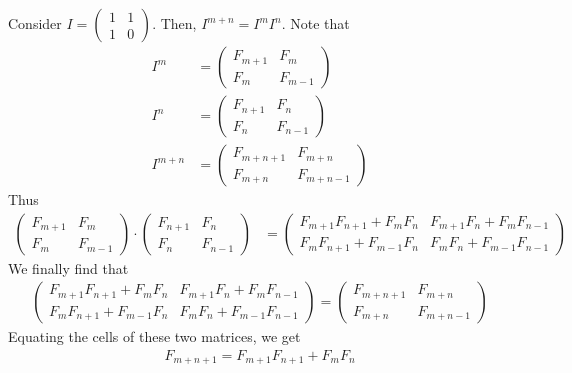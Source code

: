 \begin{solution}
Consider $I=\begin{pmatrix}
1 & 1\\
1 & 0
\end{pmatrix}$. Then, $I^{m+n}=I^mI^n$. Note that
	\begin{align*}
	I^m
		& =
		\begin{pmatrix}
			F_{m+1} & F_m\\
			F_m & F_{m-1}
		\end{pmatrix}\\
	I^n
		& =
		\begin{pmatrix}
			F_{n+1} & F_n\\
			F_n & F_{n-1}
		\end{pmatrix}\\
	 I^{m+n}
	 	& =
		\begin{pmatrix}
			F_{m+n+1} & F_{m+n}\\
			F_{m+n} & F_{m+n-1}
		\end{pmatrix}
	\end{align*}
Thus
\begin{align*}
\begin{pmatrix}
F_{m+1} & F_m\\
F_m & F_{m-1}
\end{pmatrix}
\cdot
\begin{pmatrix}
F_{n+1} & F_n\\
F_n & F_{n-1}
\end{pmatrix}
	& =
	\begin{pmatrix}
	F_{m+1}F_{n+1}+F_mF_n & F_{m+1}F_n+F_mF_{n-1}\\
	F_mF_{n+1}+F_{m-1}F_n & F_mF_n+F_{m-1}F_{n-1}
	\end{pmatrix}
\end{align*}
We finally find that
\begin{align*}
\begin{pmatrix}
F_{m+1}F_{n+1}+F_mF_n & F_{m+1}F_n+F_mF_{n-1}\\
F_mF_{n+1}+F_{m-1}F_n & F_mF_n+F_{m-1}F_{n-1}
\end{pmatrix}=
\begin{pmatrix}
F_{m+n+1} & F_{m+n}\\
F_{m+n} & F_{m+n-1}
\end{pmatrix}
\end{align*}
Equating the cells of these two matrices, we get
\begin{align*}
F_{m+n+1}=F_{m+1}F_{n+1}+F_mF_n
\end{align*}
\end{solution}

